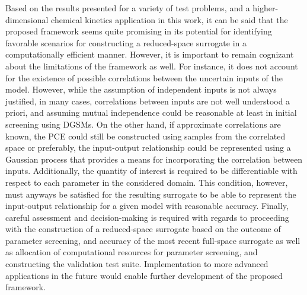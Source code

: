 Based on the results presented for a variety of test problems, and a
higher-dimensional chemical kinetics application in this work, it can be said
that the proposed framework seems quite promising in its potential for
identifying favorable scenarios for constructing a reduced-space surrogate in a
computationally efficient manner.  However, it is important to remain cognizant
about the limitations of the framework as well. For instance, it does not
account for the existence of possible correlations between the uncertain
inputs of the model. However, while the assumption of independent
inputs is not always justified, in many cases, correlations between
inputs are not well understood a priori, and assuming mutual independence
could be reasonable at least in initial screening using DGSMs. On the other
hand, if approximate correlations are known, the PCE could still be 
constructed using samples from the correlated space or preferably,
the input-output relationship could be represented using a Gaussian process
that provides a means for incorporating the correlation between inputs.  
Additionally, the quantity of interest is required to be differentiable with
respect to each parameter in the considered domain. This condition, however,
must anyways be satisfied for the resulting surrogate to be able to represent
the input-output relationship for a given model with reasonable accuracy.
Finally, careful assessment and decision-making is required with regards to
proceeding with the construction of a reduced-space surrogate based on the
outcome of parameter screening, and accuracy of the most recent full-space
surrogate as well as allocation of computational resources for parameter
screening, and constructing the validation test suite. Implementation to more
advanced applications in the future would enable further development of the
proposed framework. 

















